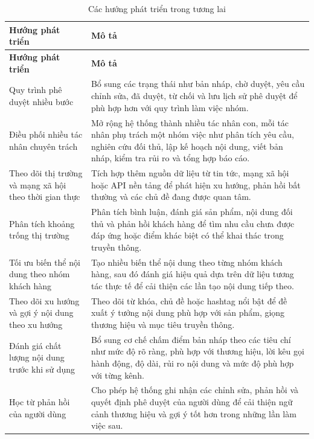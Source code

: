 \documentclass[a4paper]{article}
\renewcommand{\arraystretch}{1.25}
\begin{document}
\renewcommand{\arraystretch}{1.25}
\begin{longtable}{L{0.30\textwidth}L{0.60\textwidth}}
\caption{Các hướng phát triển trong tương lai}\\
\toprule
\textbf{Hướng phát triển} & \textbf{Mô tả}\\
\midrule
\endfirsthead
\toprule
\textbf{Hướng phát triển} & \textbf{Mô tả}\\
\midrule
\endhead

Quy trình phê duyệt nhiều bước & Bổ sung các trạng thái như bản nháp, chờ duyệt, yêu cầu chỉnh sửa, đã duyệt, từ chối và lưu lịch sử phê duyệt để phù hợp hơn với quy trình làm việc nhóm.\\

Điều phối nhiều tác nhân chuyên trách & Mở rộng hệ thống thành nhiều tác nhân con, mỗi tác nhân phụ trách một nhóm việc như phân tích yêu cầu, nghiên cứu đối thủ, lập kế hoạch nội dung, viết bản nháp, kiểm tra rủi ro và tổng hợp báo cáo.\\

Theo dõi thị trường và mạng xã hội theo thời gian thực & Tích hợp thêm nguồn dữ liệu từ tin tức, mạng xã hội hoặc API nền tảng để phát hiện xu hướng, phản hồi bất thường và các chủ đề đang được quan tâm.\\

Phân tích khoảng trống thị trường & Phân tích bình luận, đánh giá sản phẩm, nội dung đối thủ và phản hồi khách hàng để tìm nhu cầu chưa được đáp ứng hoặc điểm khác biệt có thể khai thác trong truyền thông.\\

Tối ưu biến thể nội dung theo nhóm khách hàng & Tạo nhiều biến thể nội dung theo từng nhóm khách hàng, sau đó đánh giá hiệu quả dựa trên dữ liệu tương tác thực tế để cải thiện các lần tạo nội dung tiếp theo.\\

Theo dõi xu hướng và gợi ý nội dung theo xu hướng & Theo dõi từ khóa, chủ đề hoặc hashtag nổi bật để đề xuất ý tưởng nội dung phù hợp với sản phẩm, giọng thương hiệu và mục tiêu truyền thông.\\

Đánh giá chất lượng nội dung trước khi sử dụng & Bổ sung cơ chế chấm điểm bản nháp theo các tiêu chí như mức độ rõ ràng, phù hợp với thương hiệu, lời kêu gọi hành động, độ dài, rủi ro nội dung và mức độ phù hợp với từng kênh.\\

Học từ phản hồi của người dùng & Cho phép hệ thống ghi nhận các chỉnh sửa, phản hồi và quyết định phê duyệt của người dùng để cải thiện ngữ cảnh thương hiệu và gợi ý tốt hơn trong những lần làm việc sau.\\


\end{longtable}
\end{document}

